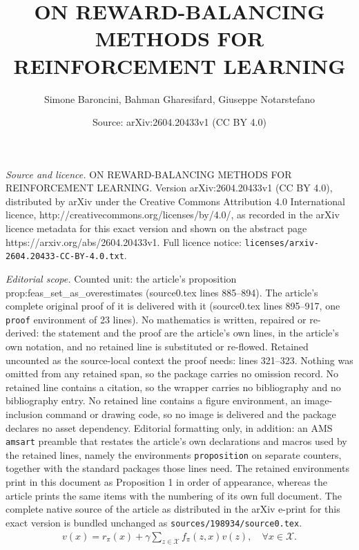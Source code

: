 \documentclass[10pt,a4paper]{amsart}
\title{ON REWARD-BALANCING METHODS FOR REINFORCEMENT LEARNING}
\author{Simone Baroncini, Bahman Gharesifard, Giuseppe Notarstefano}
\date{Source: arXiv:2604.20433v1 (CC BY 4.0)}
\newcommand{\X}{\mathcal{X}}
\newcommand{\cost}{r}
\newcommand{\costfb}[1]{\cost_{#1}}
\newcommand{\disc}{\gamma}
\newcommand{\f}{f}
\newcommand{\ffb}[1]{\f_{#1}}
\newcommand{\policy}{\pi}
\newcommand{\state}{x} %
\begin{document}
\maketitle

\noindent\emph{Source and licence.} ON REWARD-BALANCING METHODS FOR REINFORCEMENT LEARNING. Version arXiv:2604.20433v1 (CC BY 4.0), distributed by arXiv under the Creative Commons Attribution 4.0 International licence, http://creativecommons.org/licenses/by/4.0/, as recorded in the arXiv licence metadata for this exact version and shown on the abstract page https://arxiv.org/abs/2604.20433v1. Full licence notice: \texttt{licenses/arxiv-2604.20433-CC-BY-4.0.txt}.\par\smallskip

\noindent\textit{Editorial scope.} Counted unit: the article's proposition prop:feas\_set\_as\_overestimates (source0.tex lines 885--894). The article's complete original proof of it is delivered with it (source0.tex lines 895--917, one \texttt{proof} environment of 23 lines). No mathematics is written, repaired or re-derived: the statement and the proof are the article's own lines, in the article's own notation, and no retained line is substituted or re-flowed.  Retained uncounted as the source-local context the proof needs: lines 321--323.  Nothing was omitted from any retained span, so the package carries no omission record.  No retained line contains a citation, so the wrapper carries no bibliography and no bibliography entry.  No retained line contains a figure environment, an image-inclusion command or drawing code, so no image is delivered and the package declares no asset dependency.  Editorial formatting only, in addition: an AMS \texttt{amsart} preamble that restates the article's own declarations and macros used by the retained lines, namely the environments \texttt{proposition} on separate counters, together with the standard packages those lines need.  The retained environments print in this document as Proposition 1 in order of appearance, whereas the article prints the same items with the numbering of its own full document.  The complete native source of the article as distributed in the arXiv e-print for this exact version is bundled unchanged as \texttt{sources/198934/source0.tex}.
\begin{align}\label{eq:bellman_equation_v}
    v(\state) = \costfb{\policy}(\state) + \disc  \sum_{z \in \X} \ffb{\policy}(z, \state) v(z), \quad \forall\state \in \X.
\end{align}
\end{document}
